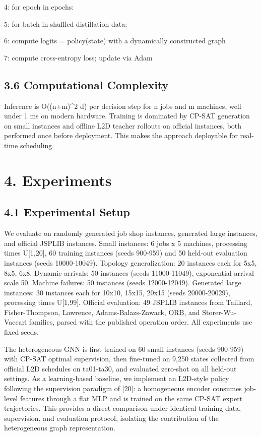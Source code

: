 \documentclass{article}
\begin{document}
4:   for epoch in epochs:

5:     for batch in shuffled distillation data:

6:       compute logits = policy(state) with a dynamically constructed graph

7:       compute cross-entropy loss; update via Adam


\subsection*{3.6 Computational Complexity}

Inference is O((n+m)\textasciicircum{}2 d) per decision step for n jobs and m machines, well under 1 ms on modern hardware. Training is dominated by CP-SAT generation on small instances and offline L2D teacher rollouts on official instances, both performed once before deployment. This makes the approach deployable for real-time scheduling.


\section*{4. Experiments}


\subsection*{4.1 Experimental Setup}

We evaluate on randomly generated job shop instances, generated large instances, and official JSPLIB instances. Small instances: 6 jobs x 5 machines, processing times U{[}1,20{]}, 60 training instances (seeds 900-959) and 50 held-out evaluation instances (seeds 10000-10049). Topology generalization: 20 instances each for 5x5, 8x5, 6x8. Dynamic arrivals: 50 instances (seeds 11000-11049), exponential arrival scale 50. Machine failures: 50 instances (seeds 12000-12049). Generated large instances: 30 instances each for 10x10, 15x15, 20x15 (seeds 20000-20029), processing times U{[}1,99{]}. Official evaluation: 49 JSPLIB instances from Taillard, Fisher-Thompson, Lawrence, Adams-Balazs-Zawack, ORB, and Storer-Wu-Vaccari families, parsed with the published operation order. All experiments use fixed seeds.

The heterogeneous GNN is first trained on 60 small instances (seeds 900-959) with CP-SAT optimal supervision, then fine-tuned on 9,250 states collected from official L2D schedules on ta01-ta30, and evaluated zero-shot on all held-out settings. As a learning-based baseline, we implement an L2D-style policy following the supervision paradigm of {[}20{]}: a homogeneous encoder consumes job-level features through a flat MLP and is trained on the same CP-SAT expert trajectories. This provides a direct comparison under identical training data, supervision, and evaluation protocol, isolating the contribution of the heterogeneous graph representation.
\end{document}
